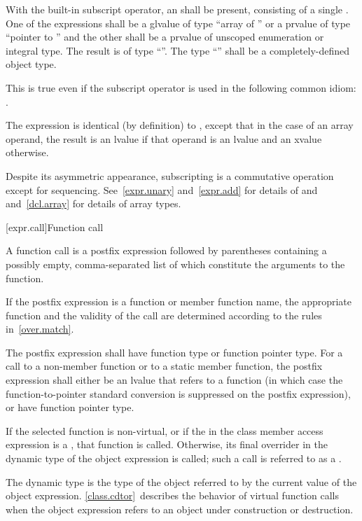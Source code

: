 \pnum
With the built-in subscript operator,
an  shall be present,
consisting of a single .
One of the expressions shall be a glvalue of type ``array of
'' or a prvalue of type ``pointer
to '' and the other shall be a prvalue of unscoped enumeration or integral type.
The result is of type ``''.
%
The type ``'' shall be a completely-defined object type.%
\begin{footnote}
This
is true even if the subscript operator is used in the following common idiom:
.
\end{footnote}
The expression  is identical (by definition) to
,
except that in the case of an array operand, the result is an lvalue
if that operand is an lvalue and an xvalue otherwise.

\pnum
\begin{note}
Despite its asymmetric appearance, subscripting is a commutative
operation except for sequencing.
See~\ref{expr.unary} and~\ref{expr.add} for details of \tcode{*} and
\tcode{+} and~\ref{dcl.array} for details of array types.
\end{note}

[expr.call]{Function call}

\pnum
{}%
%
%
A function call is a postfix expression followed by parentheses
containing a possibly empty, comma-separated list of
 which
constitute the arguments to the function.
\begin{note}
If the postfix expression is a function or member function name,
the appropriate function and the validity of the call
are determined according to the rules in~\ref{over.match}.
\end{note}
The postfix expression shall
have function type or function pointer type.
For a call to a non-member function or to a static member function,
the postfix expression shall either be an lvalue that refers to a
function (in which case the function-to-pointer standard
conversion is suppressed on the postfix expression),
or have function pointer type.

\pnum
If the selected
function is non-virtual, or if the  in the class
member access expression is a , that function is
called. Otherwise, its final overrider in the dynamic type
of the object expression is called; such a call is referred to as a
.
\begin{note}
The dynamic type is the type of the object referred to by the
current value of the object expression. \ref{class.cdtor}~describes the
behavior of virtual function calls when the object expression
refers to
an object under construction or destruction.
\end{note}

